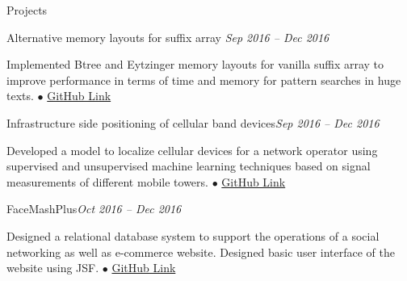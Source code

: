 \documentclass{resume} %
\begin{document}
\begin{rSection}{Projects}

\begin{rSubsection}{Alternative memory layouts for suffix array} {\emph {Sep 2016 -- Dec 2016}}{}{}
\item Implemented Btree and Eytzinger memory layouts for vanilla suffix array to improve performance in terms of time and memory for pattern searches in huge texts.
{\tiny$\bullet$}
\href{https://github.com/t-lohani/Suffixarray-Layout}{GitHub Link} 
\end{rSubsection}



\begin{rSubsection}{Infrastructure side positioning of cellular band devices}{\emph{Sep 2016 -- Dec 2016}}{}{}
\item Developed a model to localize cellular devices for a network operator using supervised and unsupervised machine learning techniques based on signal measurements of different mobile towers.
{\tiny$\bullet$}
\href{https://github.com/t-lohani/Netwok-side-Localization}{GitHub Link}
\end{rSubsection}


\begin{rSubsection}{FaceMashPlus}{\emph{Oct 2016 -- Dec 2016}}{}{}
\item Designed a relational database system to support the operations of a social networking as well as e-commerce website. Designed basic user interface of the website using JSF.
{\tiny$\bullet$}
\href{https://github.com/t-lohani/Facemash-Plus}{GitHub Link}
\end{rSubsection}

\end{rSection}
\end{document}
